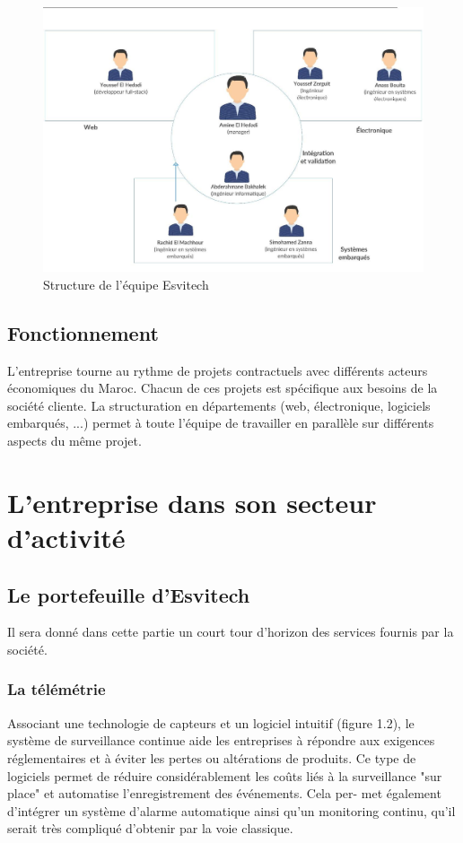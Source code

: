 \documentclass[11pt]{report}
\begin{document}
\begin{figure}[H]
	\begin{center}
		\includegraphics[width=12cm]{images/archi.png}
		\caption{Structure de l'équipe Esvitech}
		\label{fig:figure}
	\end{center}
\end{figure}

\subsection{Fonctionnement}
L'entreprise tourne au rythme de projets contractuels avec différents acteurs
économiques du Maroc. Chacun de ces projets est spécifique aux besoins de la société
cliente. La structuration en départements (web, électronique, logiciels embarqués,
...) permet à toute l'équipe de travailler en parallèle sur différents aspects du même
projet.

\section{L'entreprise dans son secteur d'activité}

\subsection{Le portefeuille d'Esvitech}
Il sera donné dans cette partie un court tour d'horizon des services fournis par
la société.
\subsubsection{La télémétrie}
Associant une technologie de capteurs et un logiciel intuitif (figure 1.2), le
système de surveillance continue aide les entreprises à répondre aux exigences réglementaires et à éviter les pertes ou altérations de produits.
Ce type de logiciels permet de réduire considérablement les coûts liés à la
surveillance "sur place" et automatise l'enregistrement des événements. Cela per-
met également d'intégrer un système d'alarme automatique ainsi qu'un monitoring
continu, qu'il serait très compliqué d'obtenir par la voie classique.
\end{document}
